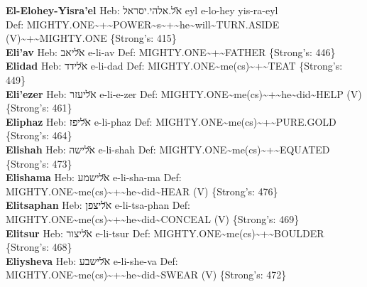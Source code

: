 {\textbf{El-Elohey-Yisra'el} Heb: {\large\H אל.אלהי.יסראל} eyl e-lo-hey yis-ra-eyl\\\hspace{0.25in}Def: MIGHTY.ONE\textasciitilde{}+\textasciitilde{}POWER\textasciitilde{}s\textasciitilde{}+\textasciitilde{}he\textasciitilde{}will\textasciitilde{}TURN.ASIDE (V)\textasciitilde{}+\textasciitilde{}MIGHTY.ONE \{Strong's: 415\}\hfill{}\\

\textbf{Eli'av} Heb: {\large\H אליאב} e-li-av Def: MIGHTY.ONE\textasciitilde{}+\textasciitilde{}FATHER \{Strong's: 446\}\hfill{}\\

\textbf{Elidad} Heb: {\large\H אלידד} e-li-dad Def: MIGHTY.ONE\textasciitilde{}me(cs)\textasciitilde{}+\textasciitilde{}TEAT \{Strong's: 449\}\hfill{}\\

\textbf{Eli'ezer} Heb: {\large\H אליעזר} e-li-e-zer Def: MIGHTY.ONE\textasciitilde{}me(cs)\textasciitilde{}+\textasciitilde{}he\textasciitilde{}did\textasciitilde{}HELP (V) \{Strong's: 461\}\hfill{}\\

\textbf{Eliphaz} Heb: {\large\H אליפז} e-li-phaz Def: MIGHTY.ONE\textasciitilde{}me(cs)\textasciitilde{}+\textasciitilde{}PURE.GOLD \{Strong's: 464\}\hfill{}\\

\textbf{Elishah} Heb: {\large\H אלישה} e-li-shah Def: MIGHTY.ONE\textasciitilde{}me(cs)\textasciitilde{}+\textasciitilde{}EQUATED \{Strong's: 473\}\hfill{}\\

\textbf{Elishama} Heb: {\large\H אלישמע} e-li-sha-ma Def: MIGHTY.ONE\textasciitilde{}me(cs)\textasciitilde{}+\textasciitilde{}he\textasciitilde{}did\textasciitilde{}HEAR (V) \{Strong's: 476\}\hfill{}\\

\textbf{Elitsaphan} Heb: {\large\H אליצפן} e-li-tsa-phan Def: MIGHTY.ONE\textasciitilde{}me(cs)\textasciitilde{}+\textasciitilde{}he\textasciitilde{}did\textasciitilde{}CONCEAL (V) \{Strong's: 469\}\hfill{}\\

\textbf{Elitsur} Heb: {\large\H אליצור} e-li-tsur Def: MIGHTY.ONE\textasciitilde{}me(cs)\textasciitilde{}+\textasciitilde{}BOULDER \{Strong's: 468\}\hfill{}\\

\textbf{Eliysheva} Heb: {\large\H אלישבע} e-li-she-va Def: MIGHTY.ONE\textasciitilde{}me(cs)\textasciitilde{}+\textasciitilde{}he\textasciitilde{}did\textasciitilde{}SWEAR (V) \{Strong's: 472\}\hfill{}\\

}

